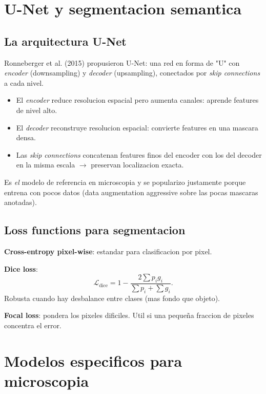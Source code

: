 \documentclass[11pt,a4paper,twoside,openright]{book}
\begin{document}
\chapter{U-Net y segmentacion semantica}

\section{La arquitectura U-Net}

Ronneberger et al. (2015) propusieron U-Net: una red en forma de "U" con \emph{encoder} (downsampling) y \emph{decoder} (upsampling), conectados por \emph{skip connections} a cada nivel.

\begin{itemize}[leftmargin=2em]
  \item El \emph{encoder} reduce resolucion espacial pero aumenta canales: aprende features de nivel alto.
  \item El \emph{decoder} reconstruye resolucion espacial: convierte features en una mascara densa.
  \item Las \emph{skip connections} concatenan features finos del encoder con los del decoder en la misma escala $\to$ preservan localizacion exacta.
\end{itemize}

Es \emph{el} modelo de referencia en microscopia y se popularizo justamente porque entrena con pocos datos (data augmentation aggressive sobre las pocas mascaras anotadas).

\section{Loss functions para segmentacion}

\textbf{Cross-entropy pixel-wise}: estandar para clasificacion por pixel.

\textbf{Dice loss}:
\begin{equation}
\mathcal{L}_{\text{dice}} = 1 - \frac{2 \sum p_i g_i}{\sum p_i + \sum g_i}.
\end{equation}
Robusta cuando hay desbalance entre clases (mas fondo que objeto).

\textbf{Focal loss}: pondera los pixeles dificiles. Util si una pequeña fraccion de pixeles concentra el error.

\chapter{Modelos especificos para microscopia}
\end{document}
